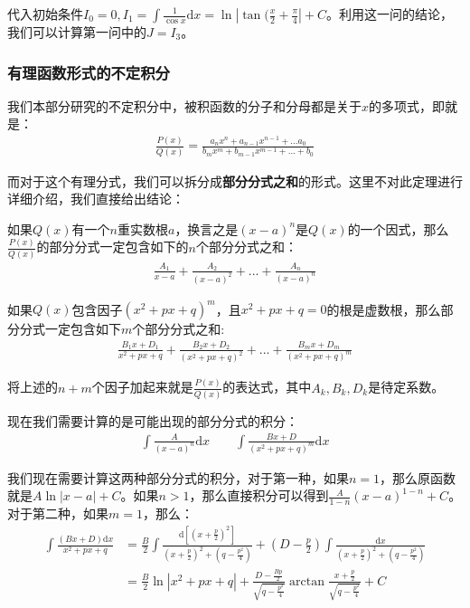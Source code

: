 \documentclass{ctexart}
\let\oldtextbf\textbf %
\renewcommand{\textbf}[1]{\textcolor{btex}{\oldtextbf{#1}}} %
\begin{document}
代入初始条件$I_0=0,I_1=\int\frac{1}{\cos x}\mathrm{d}x=\ln|\tan(\frac{x}{2}+\frac{\pi}{4}|+C$。利用这一问的结论，我们可以计算第一问中的$J=I_3$。

\subsubsection{有理函数形式的不定积分}
我们本部分研究的不定积分中，被积函数的分子和分母都是关于$x$的多项式，即就是：
\begin{align*}
    \frac{P(x)}{Q(x)}=\frac{a_nx^n+a_{n-1}x^{n-1}+...a_0}{b_mx^m+b_{m-1}x^{m-1}+...+b_0}
\end{align*}

而对于这个有理分式，我们可以拆分成\textbf{部分分式之和}的形式。这里不对此定理进行详细介绍，我们直接给出结论：
\begin{tcolorbox}[
    colback=bac1,     %
    colframe=fra1,   %
    coltitle=white,             %
    coltext=tex1,
    title=有理分式分解定理,
    fonttitle=\bfseries,        %
arc=3mm,                     %
breakable
]
如果$Q(x)$有一个$n$重实数根$a$，换言之是$(x-a)^n$是$Q(x)$的一个因式，那么$\frac{P(x)}{Q(x)}$的部分分式一定包含如下的$n$个部分分式之和：
\begin{align*}
    \frac{A_1}{x-a}+\frac{A_2}{(x-a)^2}+...+\frac{A_n}{(x-a)^n}\tag{4-8}
\end{align*}

如果$Q(x)$包含因子$(x^2+px+q)^m$，且$x^2+px+q=0$的根是虚数根，那么部分分式一定包含如下$m$个部分分式之和:
\begin{align*}
    \frac{B_1x+D_1}{x^2+px+q}+\frac{B_2x+D_2}{(x^2+px+q)^2}+...+\frac{B_mx+D_m}{(x^2+px+q)^m}\tag{4-9}
\end{align*}

将上述的$n+m$个因子加起来就是$\frac{P(x)}{Q(x)}$的表达式，其中$A_k,B_k,D_k$是待定系数。
\end{tcolorbox}

现在我们需要计算的是可能出现的部分分式的积分：
\begin{align*}
    \int\frac{A}{(x-a)^n}\mathrm{d}x\qquad\int\frac{Bx+D}{(x^2+px+q)^m}\mathrm{d}x
\end{align*}

我们现在需要计算这两种部分分式的积分，对于第一种，如果$n=1$，那么原函数就是$A\ln|x-a|+C$。如果$n>1$，那么直接积分可以得到$\frac{A}{1-n}(x-a)^{1-n}+C$。对于第二种，如果$m=1$，那么：
\begin{align*}
  \int\frac{(Bx+D)\mathrm{d}x }{x^2+px+q}&=\frac{B}{2}\int \frac{\mathrm{d}[(x+\frac{p}{2})^2]}
{(x+\frac{p}{2})^2+(q-\frac{p^2}{4})}+(D-\frac{p}{2}) \int \frac{\mathrm{d}x}
{(x+\frac{p}{2})^2+(q-\frac{p^2}{4})}\\
&=\frac{B}{2}\ln|x^2+px+q|+\frac{D-\frac{Bp}{2}}{\sqrt{q-\frac{p^2}{4}}}\arctan\frac{x+\frac{p}{2}}
{\sqrt{q-\frac{p^2}{4}}}+C  
\end{align*}
\end{document}
